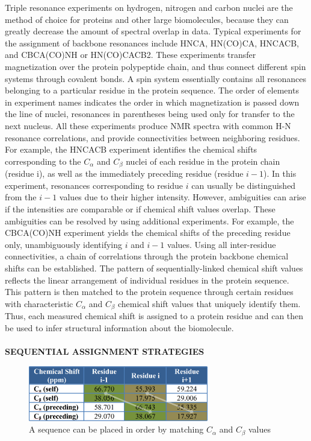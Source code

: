 \documentclass{article}
\begin{document}
Triple resonance experiments on hydrogen, nitrogen and carbon nuclei are the method of choice for proteins and other large biomolecules, because they can greatly decrease the amount of spectral overlap in data. Typical experiments for the assignment of backbone resonances include HNCA, HN(CO)CA, HNCACB, and CBCA(CO)NH or HN(CO)CACB2. These experiments transfer magnetization over the protein polypeptide chain, and thus connect different spin systems through covalent bonds. A spin system essentially contains all resonances belonging to a particular residue in the protein sequence. The order of elements in experiment names indicates the order in which magnetization is passed down the line of nuclei, resonances in parentheses being used only for transfer to the next nucleus. All these experiments produce NMR spectra with common H-N resonance correlations, and provide connectivities between neighboring residues. For example, the HNCACB experiment identifies the chemical shifts corresponding to the $C_{\alpha}$ and $C_{\beta}$ nuclei of each residue in the protein chain (residue i), as well as the immediately preceding residue (residue $i-1$). In this experiment, resonances corresponding to residue $i$ can usually be distinguished from the $i-1$ values due to their higher intensity. However, ambiguities can arise if the intensities are comparable or if chemical shift values overlap. These ambiguities can be resolved by using additional experiments. For example, the CBCA(CO)NH experiment yields the chemical shifts of the preceding residue only, unambiguously identifying $i$ and $i-1$ values. Using all inter-residue connectivities, a chain of correlations through the protein backbone chemical shifts can be established. The pattern of sequentially-linked chemical shift values reflects the linear arrangement of individual residues in the protein sequence. This pattern is then matched to the protein sequence through certain residues with characteristic $C_{\alpha}$ and $C_{\beta}$ chemical shift values that uniquely identify them. Thus, each measured chemical shift is assigned to a protein residue and can then be used to infer structural information about the biomolecule.
\\\\
\noindent \textbf{SEQUENTIAL ASSIGNMENT STRATEGIES}
\begin{figure}[b]
	\caption{A sequence can be placed in order by matching $C_{\alpha}$ and $C_{\beta}$ values}
	\label{fig:joel_figure}
	\begin{center}
		\includegraphics[keepaspectratio=true, width=0.7\textwidth]{residue_thingy}
	\end{center}
\end{figure}
\end{document}
